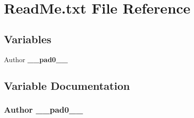 \section{Read\+Me.\+txt File Reference}
\label{ReadMe_8txt}
\subsection*{Variables}
\begin{DoxyCompactItemize}
\item 
Author {\bf \+\_\+\+\_\+pad0\+\_\+\+\_\+}
\end{DoxyCompactItemize}


\subsection{Variable Documentation}
\subsubsection[{\+\_\+\+\_\+pad0\+\_\+\+\_\+}]{\setlength{\rightskip}{0pt plus 5cm}Author \+\_\+\+\_\+pad0\+\_\+\+\_\+}\label{ReadMe_8txt_a76c1923bd4ca9d04e85c8343780912a4}
